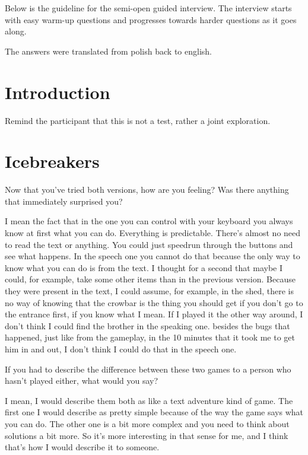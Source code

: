 

Below is the guideline for the semi-open guided interview. 
The interview starts with easy warm-up questions and progresses towards harder questions as it goes along. 

The answers were translated from polish back to english.

\section{Introduction}
Remind the participant that this is not a test, rather a joint exploration.

\section{Icebreakers}

\begin{QandA}
   \item Now that you’ve tried both versions, how are you feeling? Was there anything that immediately surprised you?
         \begin{answered}
            I mean the fact that in the one you can control with your keyboard you always know at first what you can do.
            Everything is predictable.
            There's almost no need to read the text or anything.
            You could just speedrun through the buttons and see what happens.
            In the speech one you cannot do that because the only way to know what you can do is from the text.
            I thought for a second that maybe I could, for example, take some other items than in the previous version.
            Because they were present in the text, I could assume, for example, in the shed, there is no way of knowing that the crowbar is the thing you should get if you don't go to the entrance first, if you know what I mean.
            If I played it the other way around, I don't think I could find the brother in the speaking one.
            besides the bugs that happened, just like from the gameplay, in the 10 minutes that it took me to get him in and out, I don't think I could do that in the speech one.
            \end{answered}

   \item If you had to describe the difference between these two games to a person who hasn't played either, what would you say?
         \begin{answered}
             I mean, I would describe them both as like a text adventure kind of game.
            The first one I would describe as pretty simple because of the way the game says what you can do.
            The other one is a bit more complex and you need to think about solutions a bit more.
            So it's more interesting in that sense for me, and I think that's how I would describe it to someone.
         \end{answered}
\end{QandA}




